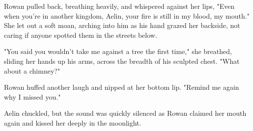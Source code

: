 Rowan pulled back, breathing heavily, and whispered against her lips, "Even when you're in another kingdom, Aelin, your fire is still in my blood, my mouth." She let out a soft moan, arching into him as his hand grazed her backside, not caring if anyone spotted them in the streets below.

"You said you wouldn't take me against a tree the first time," she breathed, sliding her hands up his arms, across the breadth of his sculpted chest. "What about a chimney?"

Rowan huffed another laugh and nipped at her bottom lip. "Remind me again why I missed you."

Aelin chuckled, but the sound was quickly silenced as Rowan claimed her mouth again and kissed her deeply in the moonlight.
